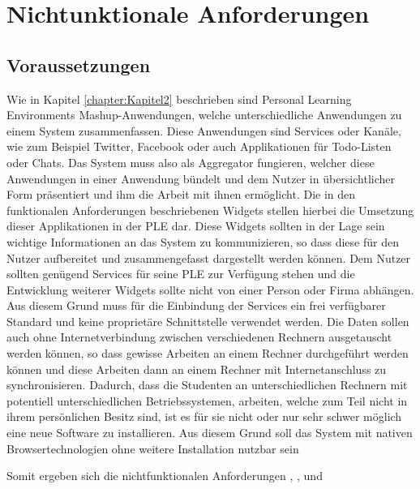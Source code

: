 \section{Nichtunktionale Anforderungen}\label{section:nichtfunktionale_anforderunge}

\subsection{Voraussetzungen}
Wie in Kapitel \ref{chapter:Kapitel2} beschrieben sind Personal Learning Environments Mashup-Anwendungen, welche unterschiedliche Anwendungen zu einem System zusammenfassen. Diese Anwendungen sind Services oder Kanäle, wie zum Beispiel Twitter, Facebook oder auch Applikationen für Todo-Listen oder Chats. Das System muss also als Aggregator fungieren, welcher diese Anwendungen in einer Anwendung bündelt und dem Nutzer in übersichtlicher Form präsentiert und ihm die Arbeit mit ihnen ermöglicht. Die in den funktionalen Anforderungen beschriebenen Widgets stellen hierbei die Umsetzung dieser Applikationen in der PLE dar. Diese Widgets sollten in der Lage sein wichtige Informationen an das System zu kommunizieren, so dass diese für den Nutzer aufbereitet und zusammengefasst dargestellt werden können. Dem Nutzer sollten genügend Services für seine PLE zur Verfügung stehen und die Entwicklung weiterer Widgets sollte nicht von einer Person oder Firma abhängen. Aus diesem Grund muss für die Einbindung der Services ein frei verfügbarer Standard und keine proprietäre Schnittstelle verwendet werden. Die Daten sollen auch ohne Internetverbindung zwischen verschiedenen Rechnern ausgetauscht werden können, so dass gewisse Arbeiten an einem Rechner durchgeführt werden können und diese Arbeiten dann an einem Rechner mit Internetanschluss zu synchronisieren. Dadurch, dass die Studenten an unterschiedlichen Rechnern mit potentiell unterschiedlichen Betriebssystemen, arbeiten, welche zum Teil nicht in ihrem persönlichen Besitz sind, ist es für sie nicht oder nur sehr schwer möglich eine neue Software zu installieren. Aus diesem Grund soll das System mit nativen Browsertechnologien ohne weitere Installation nutzbar sein

Somit ergeben sich die nichtfunktionalen Anforderungen , ,  und 
\requirement{\requirementAggregator}\label{requirementAggregator}\\
\requirement{\requirementWidgetStandard}\label{requirementWidgetStandard}\\
\requirement{\requirementUsbStick}\label{requirementUsbStick}\\
\requirement{\requirementUsageInBrowser}\label{requirementUsageInBrowser}\\

